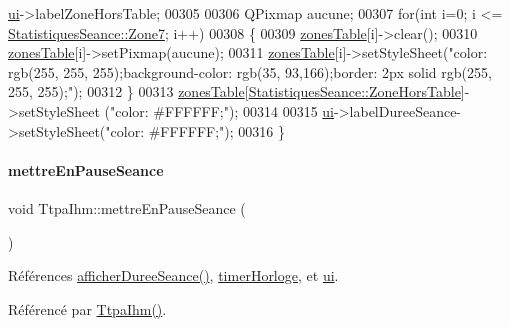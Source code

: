 \begin{DoxyCode}
      \hyperlink{class_ttpa_ihm_ad5fae1222a667da158c26f3d0f0dce23}{ui}->labelZoneHorsTable;
00305 
00306     QPixmap aucune;
00307     \textcolor{keywordflow}{for}(\textcolor{keywordtype}{int} i=0; i <= \hyperlink{class_statistiques_seance_aa839f5192cbadd7c3fb3651d62eff8b5a196adb885d7fd7109e451e759564ea64}{StatistiquesSeance::Zone7}; i++)
00308     \{
00309         \hyperlink{class_ttpa_ihm_af77d75f1aa3eb901b9410e5fc465ece8}{zonesTable}[i]->clear();
00310         \hyperlink{class_ttpa_ihm_af77d75f1aa3eb901b9410e5fc465ece8}{zonesTable}[i]->setPixmap(aucune);
00311         \hyperlink{class_ttpa_ihm_af77d75f1aa3eb901b9410e5fc465ece8}{zonesTable}[i]->setStyleSheet(\textcolor{stringliteral}{"color: rgb(255, 255, 255);background-color: rgb(35,
       93,166);border: 2px solid rgb(255, 255, 255);"});
00312     \}
00313     \hyperlink{class_ttpa_ihm_af77d75f1aa3eb901b9410e5fc465ece8}{zonesTable}[\hyperlink{class_statistiques_seance_aa839f5192cbadd7c3fb3651d62eff8b5aeb6ef225df9153e1f46a968ae71bf2f3}{StatistiquesSeance::ZoneHorsTable}]->setStyleSheet
      (\textcolor{stringliteral}{"color: #FFFFFF;"});
00314 
00315     \hyperlink{class_ttpa_ihm_ad5fae1222a667da158c26f3d0f0dce23}{ui}->labelDureeSeance->setStyleSheet(\textcolor{stringliteral}{"color: #FFFFFF;"});
00316 \}
\end{DoxyCode}
\mbox{\label{class_ttpa_ihm_a4888ff555295f4e90e0d42bd87ad2d92}} 
\paragraph{\texorpdfstring{mettre\+En\+Pause\+Seance}{mettreEnPauseSeance}}
{\footnotesize\ttfamily void Ttpa\+Ihm\+::mettre\+En\+Pause\+Seance (\begin{DoxyParamCaption}{ }\end{DoxyParamCaption})\hspace{0.3cm}{\ttfamily [slot]}}



Références \hyperlink{class_ttpa_ihm_a266897eb263e584b40fc2b7c26347623}{afficher\+Duree\+Seance()}, \hyperlink{class_ttpa_ihm_a447ad7262efa01d22bc3222e0e470087}{timer\+Horloge}, et \hyperlink{class_ttpa_ihm_ad5fae1222a667da158c26f3d0f0dce23}{ui}.



Référencé par \hyperlink{class_ttpa_ihm_ab3ed4b37a93ff04842414d4a98861d66}{Ttpa\+Ihm()}.


